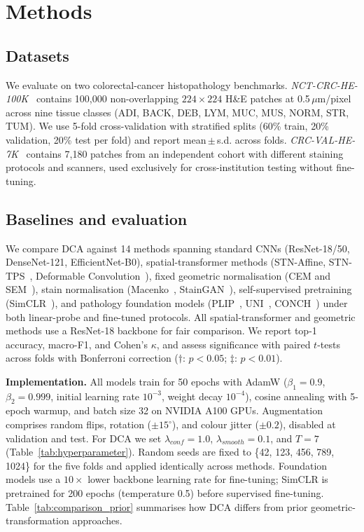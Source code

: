 
\section{Methods}
\label{sec:method}

\subsection{Datasets}

We evaluate on two colorectal-cancer histopathology benchmarks.
\textit{NCT-CRC-HE-100K}~\cite{nct_dataset} contains 100{,}000 non-overlapping
$224\times224$ H\&E patches at 0.5\,$\mu$m/pixel across nine tissue classes
(ADI, BACK, DEB, LYM, MUC, MUS, NORM, STR, TUM). We use 5-fold cross-validation
with stratified splits (60\% train, 20\% validation, 20\% test per fold) and
report mean\,$\pm$\,s.d. across folds. \textit{CRC-VAL-HE-7K}~\cite{nct_dataset}
contains 7{,}180 patches from an independent cohort with different staining
protocols and scanners, used exclusively for cross-institution testing without
fine-tuning.

\subsection{Baselines and evaluation}

We compare DCA against 14 methods spanning standard CNNs (ResNet-18/50,
DenseNet-121, EfficientNet-B0), spatial-transformer methods (STN-Affine,
STN-TPS~\cite{jaderberg2015spatial}, Deformable
Convolution~\cite{dai2017deformable}), fixed geometric normalisation (CEM and
SEM~\cite{huang2024surface}), stain normalisation
(Macenko~\cite{macenko2009method}, StainGAN~\cite{shaban2019staingan}),
self-supervised pretraining (SimCLR~\cite{chen2020simple}), and pathology
foundation models (PLIP~\cite{huang2023plip}, UNI~\cite{chen2024uni},
CONCH~\cite{lu2024conch}) under both linear-probe and fine-tuned protocols. All
spatial-transformer and geometric methods use a ResNet-18 backbone for fair
comparison. We report top-1 accuracy, macro-F1, and Cohen's $\kappa$, and assess
significance with paired $t$-tests across folds with Bonferroni correction
($\dagger$: $p<0.05$; $\ddagger$: $p<0.01$).

\textbf{Implementation.} All models train for 50 epochs with AdamW
($\beta_1=0.9$, $\beta_2=0.999$, initial learning rate $10^{-3}$, weight decay
$10^{-4}$), cosine annealing with 5-epoch warmup, and batch size 32 on NVIDIA
A100 GPUs. Augmentation comprises random flips, rotation ($\pm15^\circ$), and
colour jitter ($\pm0.2$), disabled at validation and test. For DCA we set
$\lambda_{conf}=1.0$, $\lambda_{smooth}=0.1$, and $T=7$ (Table~\ref{tab:hyperparameter}).
Random seeds are fixed to \{42, 123, 456, 789, 1024\} for the five folds and
applied identically across methods. Foundation models use a $10\times$ lower
backbone learning rate for fine-tuning; SimCLR is pretrained for 200 epochs
(temperature 0.5) before supervised fine-tuning. Table~\ref{tab:comparison_prior}
summarises how DCA differs from prior geometric-transformation approaches.

